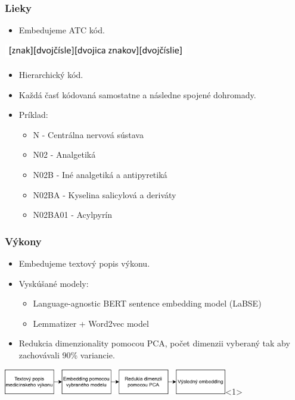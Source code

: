 \documentclass[slovak,10pt]{beamer}
\begin{document}
\begin{frame}
	\frametitle{Lieky}
	\begin{itemize}
		\item<1> Embedujeme ATC kód.
	\end{itemize}
	\begin{center}
		\includegraphics[height=0.6cm]{images/ATC_code.png}
	\end{center}
	\begin{itemize}
		\item<1> Hierarchický kód.
		\item<1> Každá časť kódovaná samostatne a následne spojené dohromady.
		\item<1> Príklad:
		\begin{itemize}
			\item<1> N - Centrálna nervová sústava
			\item<1> N02 - Analgetiká
			\item<1> N02B - Iné analgetiká a antipyretiká
			\item<1> N02BA - Kyselina salicylová a deriváty
			\item<1> N02BA01 - Acylpyrín
		\end{itemize}
		
	\end{itemize}
	
\end{frame}

\begin{frame}
	\frametitle{Výkony}
	\begin{itemize}
		\item<1> Embedujeme textový popis výkonu.
		\item<1> Vyskúšané modely:
		\begin{itemize}
			\item<1> Language-agnostic BERT sentence embedding model (LaBSE)
			\item<1> Lemmatizer + Word2vec model
		\end{itemize}
		\item<1> Redukcia dimenzionality pomocou PCA, počet dimenzii vyberaný tak aby zachovávali 90\% variancie.
	\end{itemize}
	\includegraphics[height=1.1cm]{images/vyk_flow.png}<1>
\end{frame}
\end{document}
